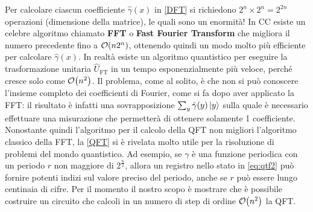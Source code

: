 \noindent Per calcolare ciascun coefficiente $\hat{\gamma}(x)$ in \eqref{DFT} si richiedono $2^n \times 2^n = 2^{2n}$ operazioni (dimensione della matrice), le quali sono un enormità! In CC esiste un celebre algoritmo chiamato \textbf{FFT} o \textbf{Fast Fourier Transform} che migliora il numero precedente fino a $\order{n 2^n}$, ottenendo quindi un modo molto più efficiente per calcolare $\hat{\gamma}(x)$. In realtà esiste un algoritmo quantistico per eseguire la trasformazione unitaria $\hat U_{\text{FT}}$ in un tempo esponenzialmente più veloce, perché cresce solo come $\order{n^2}$. Il problema, come al solito, è che non si può conoscere l'insieme completo dei coefficienti di Fourier, come si fa dopo aver applicato la FFT: il risultato è infatti una sovrapposizione $\sum_y \hat{\gamma} (y) \ket{y}$ sulla quale è necessario effettuare una misurazione che permetterà di ottenere solamente 1 coefficiente. Nonostante quindi l'algoritmo per il calcolo della QFT non migliori l'algoritmo classico della FFT, la \eqref{QFT} si è rivelata molto utile per la risoluzione di problemi del mondo quantistico. Ad esempio, se $\gamma$ è una funzione periodica con un periodo $r$ non maggiore di $2^{\frac n2}$, allora un registro nello stato in \eqref{eq:qtf2} può fornire potenti indizi sul valore preciso del periodo, anche se $r$ può essere lungo centinaia di cifre. Per il momento il nostro scopo è mostrare che è possibile costruire un circuito che calcoli in un numero di step di ordine $\order{n^2}$ la QFT.

